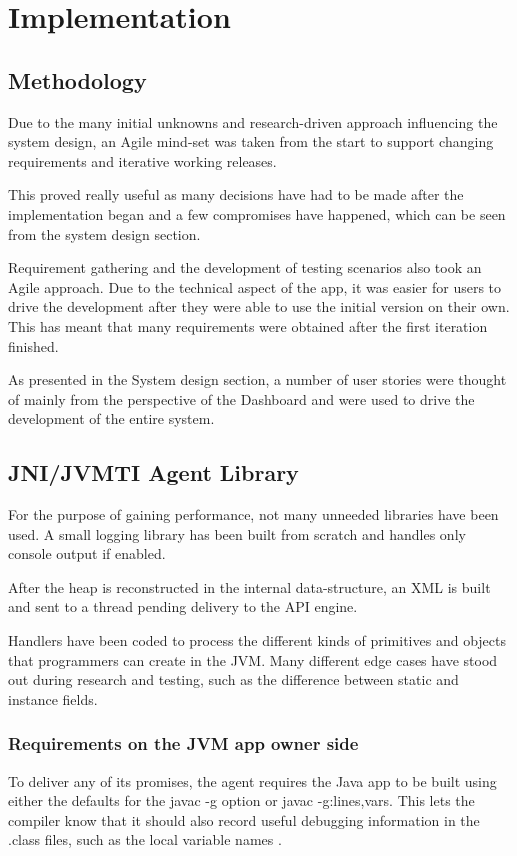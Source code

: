 \section{Implementation}

\subsection{Methodology}

Due to the many initial unknowns and research-driven approach influencing the system design, an Agile mind-set was taken from the start to support changing requirements and iterative working releases.

This proved really useful as many decisions have had to be made after the implementation began and a few compromises have happened, which can be seen from the system design section.

Requirement gathering and the development of testing scenarios also took an Agile approach. Due to the technical aspect of the app, it was easier for users to drive the development after they were able to use the initial version on their own. This has meant that many requirements were obtained after the first iteration finished.

As presented in the System design section, a number of user stories were thought of mainly from the perspective of the Dashboard and were used to drive the development of the entire system. 

\subsection{JNI/JVMTI Agent Library}
For the purpose of gaining performance, not many unneeded libraries have been used. A small logging library has been built from scratch and handles only console output if enabled.

After the heap is reconstructed in the internal data-structure, an XML is built and sent to a thread pending delivery to the API engine.

Handlers have been coded to process the different kinds of primitives and objects that programmers can create in the JVM. Many different edge cases have stood out during research and testing, such as the difference between static and instance fields.

\subsubsection{Requirements on the JVM app owner side}
To deliver any of its promises, the agent requires the Java app to be built using either the defaults for the javac -g option or javac -g:lines,vars. This lets the compiler know that it should also record useful debugging information in the .class files, such as the local variable names \cite{javac}.

